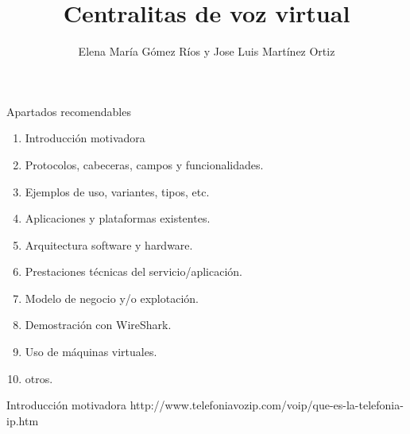 \documentclass[11pt]{beamer}
\author{Elena María Gómez Ríos y Jose Luis Martínez Ortiz}
\title{Centralitas de voz virtual} %
\begin{document}
\begin{frame}
\titlepage
\end{frame}


\begin{frame}{Apartados recomendables}
\begin{enumerate}
\item Introducción motivadora
\item Protocolos, cabeceras, campos y funcionalidades.
\item Ejemplos de uso, variantes, tipos, etc.
\item Aplicaciones y plataformas existentes.
\item Arquitectura software y hardware.
\item Prestaciones técnicas del servicio/aplicación.
\item Modelo de negocio y/o explotación.
\item Demostración con WireShark.
\item Uso de máquinas virtuales.
\item otros.
\end{enumerate}
\end{frame}

\begin{frame}{Introducción motivadora}
http://www.telefoniavozip.com/voip/que-es-la-telefonia-ip.htm

\end{frame}
\end{document}
